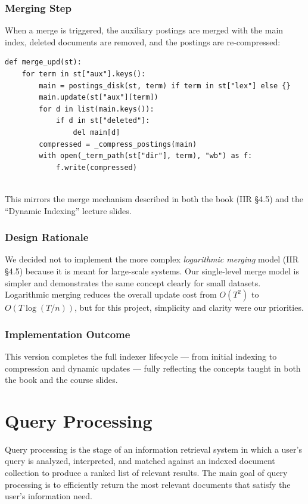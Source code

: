 \documentclass[11pt,a4paper]{article}
\begin{document}
\subsubsection{Merging Step}

When a merge is triggered, the auxiliary postings are merged with the main index,
deleted documents are removed, and the postings are re-compressed:
\begin{verbatim}
def merge_upd(st):
    for term in st["aux"].keys():
        main = postings_disk(st, term) if term in st["lex"] else {}
        main.update(st["aux"][term])
        for d in list(main.keys()):
            if d in st["deleted"]:
                del main[d]
        compressed = _compress_postings(main)
        with open(_term_path(st["dir"], term), "wb") as f:
            f.write(compressed)
\end{verbatim}
\\
This mirrors the merge mechanism described in both the book (IIR §4.5) and the “Dynamic Indexing” lecture slides.

\subsubsection{Design Rationale}

We decided not to implement the more complex \textit{logarithmic merging} model (IIR §4.5) because it is meant for large-scale systems.
Our single-level merge model is simpler and demonstrates the same concept clearly for small datasets.
Logarithmic merging reduces the overall update cost from $O(T^2)$ to $O(T \log (T/n))$, but for this project, simplicity and clarity were our priorities.

\subsubsection{Implementation Outcome}

This version completes the full indexer lifecycle — from initial indexing to compression and dynamic updates —
fully reflecting the concepts taught in both the book and the course slides.


\section{Query Processing}
\label{sec:query}
Query processing is the stage of an information retrieval system in which a user's query is analyzed, interpreted, and matched against an indexed document collection to produce a ranked list of relevant results. The main goal of query processing is to efficiently return the most relevant documents that satisfy the user's information need.
\end{document}
